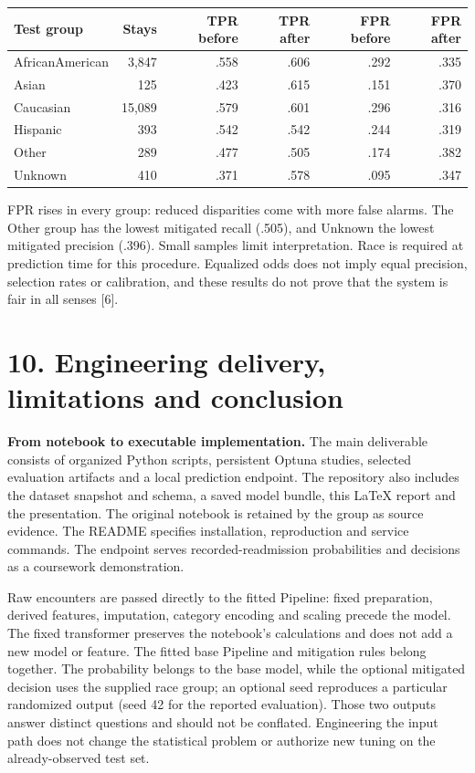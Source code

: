 \documentclass[11pt,a4paper]{article}
\newcommand{\pageheading}[2]{\section*{\color{ink}#1. #2}}
\newcommand{\nextpage}{\clearpage}
\begin{document}
\begin{center}\small\begin{tabular}{lrrrrr}\toprule
Test group & Stays & TPR before & TPR after & FPR before & FPR after\\\midrule
AfricanAmerican & 3,847 & .558 & .606 & .292 & .335\\
Asian & 125 & .423 & .615 & .151 & .370\\
Caucasian & 15,089 & .579 & .601 & .296 & .316\\
Hispanic & 393 & .542 & .542 & .244 & .319\\
Other & 289 & .477 & .505 & .174 & .382\\
Unknown & 410 & .371 & .578 & .095 & .347\\\bottomrule
\end{tabular}\end{center}
FPR rises in every group: reduced disparities come with more false alarms. The Other group has the lowest mitigated recall (.505), and Unknown the lowest mitigated precision (.396). Small samples limit interpretation. Race is required at prediction time for this procedure. Equalized odds does not imply equal precision, selection rates or calibration, and these results do not prove that the system is fair in all senses [6].

\nextpage
\pageheading{10}{Engineering delivery, limitations and conclusion}
\textbf{From notebook to executable implementation.} The main deliverable consists of organized Python scripts, persistent Optuna studies, selected evaluation artifacts and a local prediction endpoint. The repository also includes the dataset snapshot and schema, a saved model bundle, this LaTeX report and the presentation. The original notebook is retained by the group as source evidence. The README specifies installation, reproduction and service commands. The endpoint serves recorded-readmission probabilities and decisions as a coursework demonstration.

Raw encounters are passed directly to the fitted Pipeline: fixed preparation, derived features, imputation, category encoding and scaling precede the model. The fixed transformer preserves the notebook's calculations and does not add a new model or feature. The fitted base Pipeline and mitigation rules belong together. The probability belongs to the base model, while the optional mitigated decision uses the supplied race group; an optional seed reproduces a particular randomized output (seed 42 for the reported evaluation). Those two outputs answer distinct questions and should not be conflated. Engineering the input path does not change the statistical problem or authorize new tuning on the already-observed test set.
\end{document}
